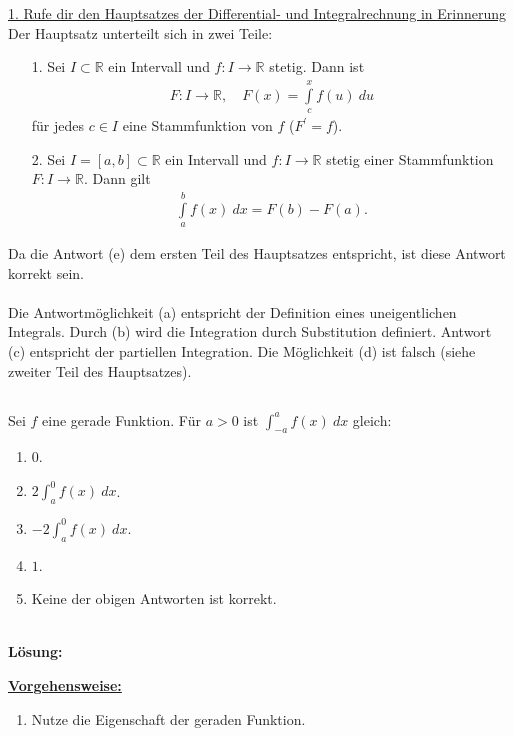 \underline{1. Rufe dir den Hauptsatzes der Differential- und Integralrechnung in Erinnerung}\\
Der Hauptsatz unterteilt sich in zwei Teile:
\begin{enumerate}
	\item[1.] 
	Sei $I \subset \mathbb{R}  $ ein Intervall und $f : I \to \mathbb{R}$ stetig.
	Dann ist
	\begin{align*}
		F : I \to \mathbb{R}, \quad F(x) = \int \limits_{c}^x f(u) \ du
	\end{align*}
	für jedes $c \in I $ eine Stammfunktion von $f$ ($F^\prime = f$).
	\item[2.]
	Sei $I = [a,b] \subset \mathbb{R} $ ein Intervall und $f: I \to \mathbb{R}$ stetig einer Stammfunktion $F : I \to \mathbb{R}$. Dann gilt
	\begin{align*}
		\int \limits_a^b f(x) \ dx = F(b) - F(a).
	\end{align*}
\end{enumerate}
Da die Antwort (e) dem ersten Teil des Hauptsatzes entspricht, ist diese Antwort korrekt sein.\\
\\
Die Antwortmöglichkeit (a) entspricht der Definition eines uneigentlichen Integrals.
Durch (b) wird die Integration durch Substitution definiert. Antwort (c) entspricht der partiellen Integration. 
Die Möglichkeit (d) ist falsch (siehe zweiter Teil des Hauptsatzes). 


\newpage

\subsection*{}
Sei $ f $ eine gerade Funktion.
Für $a > 0$ ist $\int_{-a}^a f(x) \ dx$ gleich:
\renewcommand{\labelenumi}{(\alph{enumi})}
\begin{enumerate}
	\item 
	$ 0 $.
	\item
	$ 2 \int_a^0 f(x) \ dx $.
	\item
	$ -2  \int_a^0 f(x) \ dx$.
	\item
	$ 1 $.
	\item
	Keine der obigen Antworten ist korrekt.
\end{enumerate}
\ \\
\textbf{Lösung:}
\begin{mdframed}
\underline{\textbf{Vorgehensweise:}}
\renewcommand{\labelenumi}{\theenumi.}
\begin{enumerate}
\item Nutze die Eigenschaft der geraden Funktion.
\end{enumerate}
\end{mdframed}

